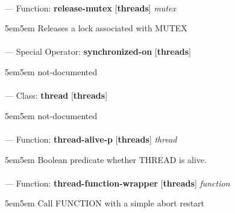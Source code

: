 \paragraph{}
\label{THREADS:RELEASE-MUTEX}
--- Function: \textbf{release-mutex} [\textbf{threads}] \textit{mutex}

\begin{adjustwidth}{5em}{5em}
Releases a lock associated with MUTEX
\end{adjustwidth}

\paragraph{}
\label{THREADS:SYNCHRONIZED-ON}
--- Special Operator: \textbf{synchronized-on} [\textbf{threads}] \textit{}

\begin{adjustwidth}{5em}{5em}
not-documented
\end{adjustwidth}

\paragraph{}
\label{THREADS:THREAD}
--- Class: \textbf{thread} [\textbf{threads}] \textit{}

\begin{adjustwidth}{5em}{5em}
not-documented
\end{adjustwidth}

\paragraph{}
\label{THREADS:THREAD-ALIVE-P}
--- Function: \textbf{thread-alive-p} [\textbf{threads}] \textit{thread}

\begin{adjustwidth}{5em}{5em}
Boolean predicate whether THREAD is alive.
\end{adjustwidth}

\paragraph{}
\label{THREADS:THREAD-FUNCTION-WRAPPER}
--- Function: \textbf{thread-function-wrapper} [\textbf{threads}] \textit{function}

\begin{adjustwidth}{5em}{5em}
Call FUNCTION with a simple abort restart
\end{adjustwidth}

